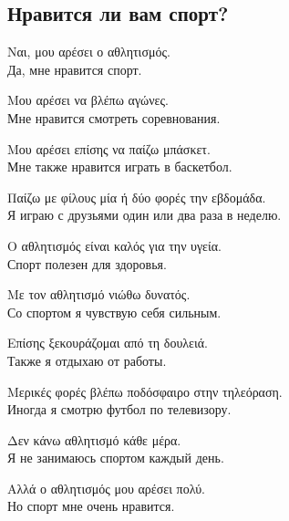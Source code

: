\documentclass[12pt]{article}
\newcommand{\my}[1]{\textcolor{gray!80!white}{#1}}
\newenvironment{page}{\clearpage\normalsize\null\vfill}{\vfill\null}
\newenvironment{textblock}{\begin{minipage}{\textwidth}}{\end{minipage}\smallskip}
\begin{document}
	\begin{page}
		\subsection{Нравится ли вам спорт?}
		\small
		\begin{textblock}
			Ναι, μου αρέσει ο αθλητισμός.\\
			\my{Да, мне нравится спорт.}
			
			Μου αρέσει να βλέπω αγώνες.\\
			\my{Мне нравится смотреть соревнования.}
			
			Μου αρέσει επίσης να παίζω μπάσκετ.\\
			\my{Мне также нравится играть в баскетбол.}
			
			Παίζω με φίλους μία ή δύο φορές την εβδομάδα.\\
			\my{Я играю с друзьями один или два раза в неделю.}
			
			Ο αθλητισμός είναι καλός για την υγεία.\\
			\my{Спорт полезен для здоровья.}
			
			Με τον αθλητισμό νιώθω δυνατός.\\
			\my{Со спортом я чувствую себя сильным.}
			
			Επίσης ξεκουράζομαι από τη δουλειά.\\
			\my{Также я отдыхаю от работы.}
			
			Μερικές φορές βλέπω ποδόσφαιρο στην τηλεόραση.\\
			\my{Иногда я смотрю футбол по телевизору.}
			
			Δεν κάνω αθλητισμό κάθε μέρα.\\
			\my{Я не занимаюсь спортом каждый день.}
			
			Αλλά ο αθλητισμός μου αρέσει πολύ.\\
			\my{Но спорт мне очень нравится.}
		\end{textblock}
	\end{page}
	
\end{document}
